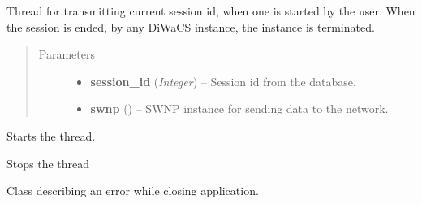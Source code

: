 \documentclass[letterpaper,10pt,english]{sphinxmanual}
\begin{document}

\begin{fulllineitems}
\label{wos:wos.CURRENT_SESSION}
Thread for transmitting current session id, when one is started by
the user.  When the session is ended, by any DiWaCS instance, the
instance is terminated.
\begin{quote}\begin{description}
\item[{Parameters}] \leavevmode\begin{itemize}
\item {} 
\textbf{session\_id} (\emph{Integer}) -- Session id from the database.

\item {} 
\textbf{swnp} ({\hyperref[swnp:swnp.SWNP]{}}) -- SWNP instance for sending data to the network.

\end{itemize}

\end{description}\end{quote}

\begin{fulllineitems}
\label{wos:wos.CURRENT_SESSION.run}
Starts the thread.

\end{fulllineitems}


\begin{fulllineitems}
\label{wos:wos.CURRENT_SESSION.stop}
Stops the thread

\end{fulllineitems}


\end{fulllineitems}


\begin{fulllineitems}
\label{wos:wos.CloseError}
Class describing an error while closing application.

\end{fulllineitems}
\end{document}
